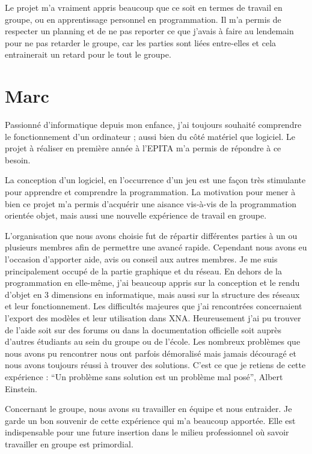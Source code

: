 \documentclass[11pt]{report}
\begin{document}
Le projet m’a vraiment appris beaucoup que ce soit en termes de travail en groupe, ou en apprentissage personnel en programmation. Il m’a permis de respecter un planning et de ne pas reporter ce que j’avais à faire au lendemain pour ne pas retarder le groupe, car les parties sont liées entre-elles et cela entrainerait un retard pour le tout le groupe. 


\section{Marc}

Passionné d’informatique depuis mon enfance, j’ai toujours souhaité comprendre le fonctionnement d’un ordinateur ; aussi bien du côté matériel que logiciel. Le projet à réaliser en première année à l’EPITA m’a permis de répondre à ce besoin.

La conception d’un logiciel, en l’occurrence d’un jeu est une façon très stimulante pour apprendre et comprendre la programmation. La motivation pour mener à bien ce projet m’a permis d’acquérir une aisance vis-à-vis de la programmation orientée objet, mais aussi une nouvelle expérience de travail en groupe.

L’organisation que nous avons choisie fut de répartir différentes parties à un ou plusieurs membres afin de permettre une avancé rapide. Cependant nous avons eu l’occasion d’apporter aide, avis ou conseil aux autres membres.  Je me suis principalement occupé de la partie graphique et du réseau. En dehors de la programmation en elle-même, j’ai beaucoup appris sur la conception et le rendu d’objet en 3 dimensions en informatique, mais aussi sur la structure des réseaux et leur fonctionnement. Les difficultés majeures que j’ai rencontrées concernaient l’export des modèles et leur utilisation dans XNA. Heureusement j’ai pu trouver de l’aide soit sur des forums ou dans la documentation officielle soit auprès d’autres étudiants au sein du groupe ou de l’école. Les nombreux problèmes que nous avons pu rencontrer nous ont parfois démoralisé mais jamais découragé et nous avons toujours réussi à trouver des solutions. C’est ce que je retiens de cette expérience : ``Un problème sans solution est un problème mal posé'', Albert Einstein.

Concernant le groupe, nous avons su travailler en équipe et nous entraider. Je garde un bon souvenir de cette expérience qui m’a beaucoup apportée. Elle est indispensable pour une future insertion dans le milieu professionnel où savoir travailler en groupe est primordial.
\end{document}
